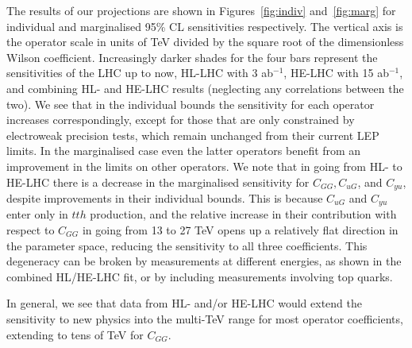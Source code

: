 \documentclass[../report.tex]{subfiles}
\providecommand{\main}{..}
\begin{document}
The results of our projections are shown in Figures~\ref{fig:indiv} and~\ref{fig:marg} for individual and marginalised 95\% CL sensitivities respectively. The vertical axis is the operator scale in units of TeV divided by the square root of the dimensionless Wilson coefficient. Increasingly darker shades for the four bars represent the sensitivities of the LHC up to now, HL-LHC with 3 ab$^{-1}$, HE-LHC with 15 ab$^{-1}$, and combining HL- and HE-LHC results (neglecting any correlations between the two). We see that in the individual bounds the sensitivity for each operator increases correspondingly, except for those that are only constrained by electroweak precision tests, which remain unchanged from their current LEP limits. In the marginalised case even the latter operators benefit from an improvement in the limits on other operators. We note that in going from HL- to HE-LHC there is a decrease in the marginalised sensitivity for $C_{GG}, C_{uG}$, and $C_{yu}$, despite improvements in their individual bounds. This is because $C_{uG}$ and $C_{yu}$ enter only in $tth$ production, and the relative increase in their contribution with respect to $C_{GG}$ in going from 13 to 27 TeV opens up a relatively flat direction in the parameter space, reducing the sensitivity to all three coefficients. This degeneracy can be broken by measurements at different energies, as shown in the combined HL/HE-LHC fit, or by including measurements involving top quarks.

In general, we see that data from HL- and/or HE-LHC would extend the sensitivity to new physics into the multi-TeV range
for most operator coefficients, extending to tens of TeV for $C_{GG}$.










\end{document}
